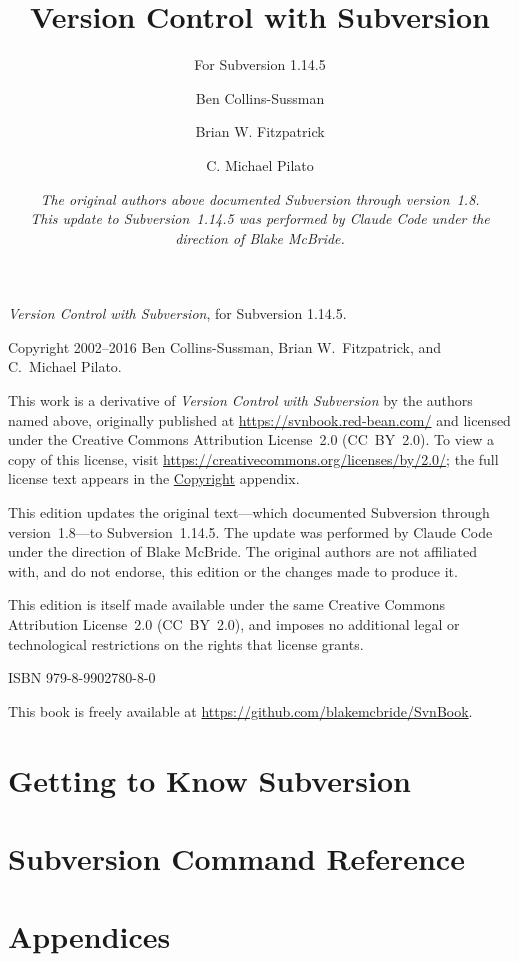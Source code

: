 \documentclass[
]{book}
\title{Version Control with Subversion}
\subtitle{For Subversion 1.14.5}
\author{Ben Collins-Sussman \and Brian W. Fitzpatrick \and C. Michael
Pilato}
\date{\normalsize\itshape The original authors above documented Subversion
through version~1.8.\\[6pt]
This update to Subversion~1.14.5 was performed by Claude Code under the
direction of Blake McBride.}
\makeatletter
\renewcommand\_{\svn@us\discretionary{}{}{}}
\makeatother
\begin{document}
\frontmatter
\maketitle

\thispagestyle{empty}
\null\vfill
\begingroup
\setlength{\parindent}{0pt}\setlength{\parskip}{6pt}\small
\textit{Version Control with Subversion}, for Subversion 1.14.5.

Copyright \textcopyright{} 2002--2016 Ben Collins-Sussman,
Brian W.~Fitzpatrick, and C.~Michael Pilato.

This work is a derivative of \textit{Version Control with Subversion} by the
authors named above, originally published at
\url{https://svnbook.red-bean.com/} and licensed under the Creative Commons
Attribution License~2.0 (CC~BY~2.0). To view a copy of this license, visit
\url{https://creativecommons.org/licenses/by/2.0/}; the full license text
appears in the \hyperref[svn.copyright]{Copyright} appendix.

This edition updates the original text---which documented Subversion through
version~1.8---to Subversion~1.14.5. The update was performed by Claude Code
under the direction of Blake McBride. The original authors are not affiliated
with, and do not endorse, this edition or the changes made to produce it.

This edition is itself made available under the same Creative Commons
Attribution License~2.0 (CC~BY~2.0), and imposes no additional legal or
technological restrictions on the rights that license grants.

ISBN 979-8-9902780-8-0

This book is freely available at
\url{https://github.com/blakemcbride/SvnBook}.
\endgroup
\clearpage

{
\setcounter{tocdepth}{1}
\tableofcontents
}
\mainmatter


\part{Getting to Know Subversion}\label{svn.content}









\part{Subversion Command Reference}\label{svn.ref}












\part{Appendices}\label{svn.apps}





\backmatter
\end{document}
